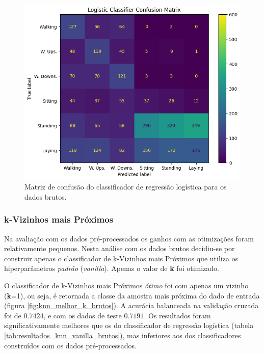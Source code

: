 \documentclass[final,5p]{elsarticle}
\numberwithin{equation}{section}
\begin{document}
        \begin{figure}[hbt!]
            \includegraphics[width=0.95\columnwidth]{B_Logistic_CM.png}
            \caption{Matriz de confusão do classificador de regressão logística para os dados brutos.}
            \label{fig:cm_logistico_brutos}
        \end{figure}

    \subsubsection{k-Vizinhos mais Próximos}

        Na avaliação com os dados pré-processados os ganhos com as otimizações foram relativamente pequenos. Nesta análise com os dados brutos decidiu-se por construir apenas o classificador de k-Vizinhos mais Próximos que utiliza os hiperparâmetros \emph{padrão} (\emph{vanilla}). Apenas o valor de \textbf{k} foi otimizado.

        O classificador de k-Vizinhos mais Próximos \emph{ótimo} foi com apenas um vizinho (\textbf{k}=1), ou seja, é retornada a classe da amostra mais próxima do dado de entrada (figura \ref{fig:knn_melhor_k_brutos}). A acurácia balanceada na validação cruzada foi de $0.7424$, e com os dados de teste $0.7191$. Os resultados foram significativamente melhores que os do classificador de regressão logística (tabela \ref{tab:resultados_knn_vanilla_brutos}), mas inferiores aos dos classificadores construídos com os dados pré-processados.
\end{document}
